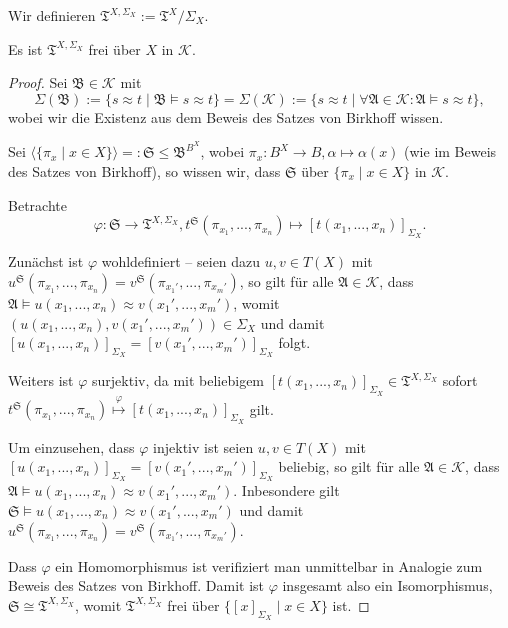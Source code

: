 \begin{definition}
    Wir definieren $ \mathfrak{T}^{X, \Sigma_X} := \mathfrak{T}^X / \Sigma_X$.
\end{definition}

\begin{theorem}
    Es ist $\mathfrak{T}^{X, \Sigma_X}$ frei über $X$ in $\mathcal{K}$.
\end{theorem}

\begin{proof}
    Sei $\mathfrak{B} \in \mathcal{K}$ mit
    $$ \Sigma(\mathfrak{B}) := \{ s \approx t \mid \mathfrak{B} \models s \approx t \} = \Sigma(\mathcal{K}) := \{ s \approx t \mid \forall \mathfrak{A} \in \mathcal{K}: \mathfrak{A} \models s \approx t \}, $$
    wobei wir die Existenz aus dem Beweis des Satzes von Birkhoff wissen.
    
    Sei $\langle \{ \pi_x \mid x \in X \} \rangle =: \mathfrak{S} \leq \mathfrak{B}^{B^X}$, wobei $\pi_x : B^X \to B, \alpha \mapsto \alpha(x)$ (wie im Beweis des Satzes von Birkhoff), so wissen wir, dass $\mathfrak{S}$ über $\{ \pi_x \mid x \in X \}$ in $\mathcal{K}$.

    Betrachte
    $$ \varphi: \mathfrak{S} \to \mathfrak{T}^{X, \Sigma_X}, t^\mathfrak{S} (\pi_{x_1}, ..., \pi_{x_n}) \mapsto [t(x_1,...,x_n)]_{\Sigma_X}. $$

    Zunächst ist $\varphi$ wohldefiniert -- seien dazu $u, v \in T(X)$ mit $u^\mathfrak{S} (\pi_{x_1}, ..., \pi_{x_n}) = v^\mathfrak{S}(\pi_{x_1'}, ..., \pi_{x_m'})$, so gilt für alle $\mathfrak{A} \in \mathcal{K}$, dass $\mathfrak{A} \models u(x_1, ..., x_n) \approx v(x_1', ..., x_m')$, womit $(u(x_1, ..., x_n), v(x_1', ..., x_m')) \in \Sigma_X$ und damit $[u(x_1, ..., x_n)]_{\Sigma_X} = [v(x_1', ..., x_m')]_{\Sigma_X}$ folgt.

    Weiters ist $\varphi$ surjektiv, da mit beliebigem $[t(x_1,...,x_n)]_{\Sigma_X} \in \mathfrak{T}^{X, \Sigma_X}$ sofort \\ $t^\mathfrak{S}(\pi_{x_1}, ..., \pi_{x_n}) \overset{\varphi}{\mapsto} [t(x_1,...,x_n)]_{\Sigma_X}$ gilt.

    Um einzusehen, dass $\varphi$ injektiv ist seien $u, v \in T(X)$ mit $[u(x_1, ..., x_n)]_{\Sigma_X} = [v(x_1', ..., x_m')]_{\Sigma_X}$ beliebig, so gilt für alle $\mathfrak{A} \in \mathcal{K}$, dass $\mathfrak{A} \models u(x_1, ..., x_n) \approx v(x_1', ..., x_m')$. Inbesondere gilt $\mathfrak{S} \models u(x_1, ..., x_n) \approx v(x_1', ..., x_m')$ und damit $u^\mathfrak{S}(\pi_{x_1}, ..., \pi_{x_n}) = v^\mathfrak{S}(\pi_{x_1'}, ..., \pi_{x_m'})$.

    Dass $\varphi$ ein Homomorphismus ist verifiziert man unmittelbar in Analogie zum Beweis des Satzes von Birkhoff. Damit ist $\varphi$ insgesamt also ein Isomorphismus, $\mathfrak{S} \cong \mathfrak{T}^{X, \Sigma_X}$, womit $\mathfrak{T}^{X, \Sigma_X}$ frei über $\{ [x]_{\Sigma_X} \mid x \in X \}$ ist.
\end{proof}

